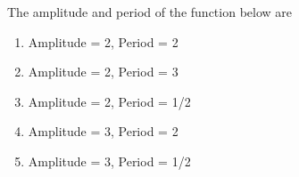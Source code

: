 \bigskip

\item The amplitude and period of the function below are


\begin{minipage}{0.4\columnwidth}
    \begin{enumerate}
        \item Amplitude = 2, Period = 2
        \item Amplitude = 2, Period = 3
        \item Amplitude = 2, Period = 1/2
        \item Amplitude = 3, Period = 2
        \item Amplitude = 3, Period = 1/2
    \end{enumerate}
\end{minipage}
\begin{minipage}{0.6\columnwidth}
\end{minipage}


